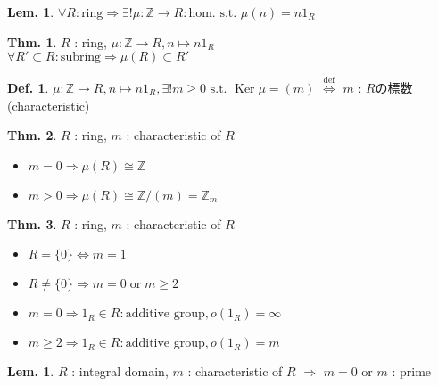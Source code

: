\documentclass[uplatex,dvipdfmx,9pt]{beamer}
\newcommand{\defarrow}{\overset{\mathrm{def}}{\Leftrightarrow}}
\newcommand{\st}{\text{ s.t. }}
\newcommand{\Ker}{\operatorname{Ker}}
\renewcommand{\hom}{\text{hom.}} %
\newcommand{\Z}{\mathbb{Z}}
\newcounter{textLemCount}
\theoremstyle{definition} %
\newtheorem{defn}{Def.}[subsection] %
\newtheorem{thm}{Thm.}[subsection] %
\newtheorem{lemText}[textLemCount]{Lem.} %
\theoremstyle{example}
\begin{document}
    \begin{frame}

      \begin{lemText}
        $\forall R : \text{ring} \Rightarrow \exists! \mu\colon \Z \to R : \hom \st \mu(n) = n1_R$ 
      \end{lemText}

      \begin{thm}
        $R$ : ring, $\mu\colon \Z \to R, n \mapsto n1_R$ \\
        $\forall R' \subset R : \text{subring} \Rightarrow \mu(R) \subset R'$
      \end{thm}

      \begin{defn}
        $\mu\colon \Z \to R, n \mapsto n1_R, \exists! m \ge 0 \st \Ker\mu = (m)$ $\defarrow$ $m$ : $R$の\alert{標数(characteristic)}
      \end{defn}

      \begin{thm}
        $R$ : ring, $m$ : characteristic of $R$
        \begin{itemize}
          \item $m = 0 \Rightarrow \mu(R) \cong \Z$
          \item $m > 0 \Rightarrow \mu(R) \cong \Z/(m) = \Z_m$
        \end{itemize}
      \end{thm}
      
    \end{frame}

    \begin{frame}

     \begin{thm}
      $R$ : ring, $m$ : characteristic of $R$
      \begin{itemize}
        \item $R = \{0\} \Leftrightarrow m = 1$
        \item $R \neq \{0\} \Rightarrow m = 0 \; \text{or} \; m \ge 2$
        \item $m = 0 \Rightarrow 1_R \in R : \text{additive group}, o(1_R) = \infty$
        \item $m \ge 2 \Rightarrow 1_R \in R : \text{additive group}, o(1_R) = m$
      \end{itemize}
    \end{thm} 

    \begin{lemText}
      $R$ : integral domain, $m$ : characteristic of $R$ $\Rightarrow$ $m = 0$ or $m$ : prime
    \end{lemText}

    \end{frame}
\end{document}
